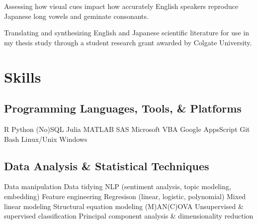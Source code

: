 \documentclass[letterpaper]{deedy-resume_sm} %
\begin{document}
\sectionspace %
\begin{tightitemize}
\item Assessing how visual cues impact how accurately English speakers reproduce Japanese long vowels and geminate consonants.
\end{tightitemize}
\sectionspace %
\begin{tightitemize}
\item Translating and synthesizing English and Japanese scientific literature for use in my thesis study through a student research grant awarded by Colgate University.
\end{tightitemize}
\sectionspace %

\section{Skills}
\subsection{Programming Languages, Tools, \& Platforms}
R \textbullet{} Python \textbullet{} (No)SQL \textbullet{} Julia \textbullet{} MATLAB \textbullet{} SAS \textbullet{} Microsoft VBA \textbullet{} Google AppsScript \textbullet{} Git \textbullet{} Bash \textbullet{} Linux/Unix \textbullet{} Windows
\sectionspace
\subsection{Data Analysis \& Statistical Techniques}
Data manipulation \textbullet{} Data tidying \textbullet{} NLP (sentiment analysis, topic modeling, embedding) \textbullet{} Feature engineering \textbullet{} Regresison (linear, logistic, polynomial) \textbullet{} Mixed linear modeling \textbullet{} Structural equation modeling \textbullet{} (M)AN(C)OVA \textbullet{} Unsupervised \& supervised classification \textbullet{} Principal component analysis \& dimensionality reduction\\
\sectionspace
\end{document}

